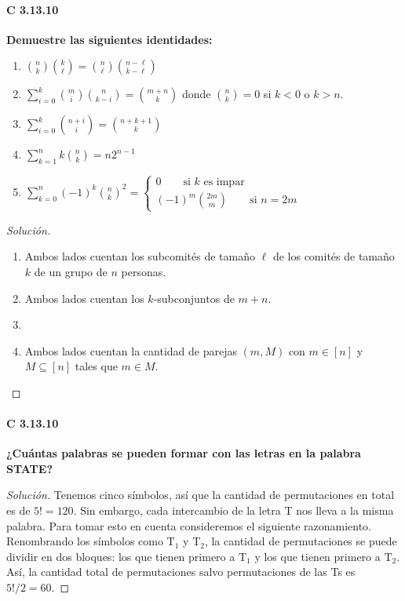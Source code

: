 \documentclass[spanish]{book}
\theoremstyle{definition}
\begin{document}
\paragraph{C 3.13.10} \textbf{Demuestre las siguientes identidades:}
\begin{enumerate}[label=(\alph*)]
	\item ${n\choose k}{k\choose\ell}={n\choose\ell}{n-\ell\choose k-\ell}$
	\item $\sum_{i=0}^k{m\choose i}{n\choose k-i}={m+n\choose k}$ donde ${n\choose k}=0$ si $k<0$ o $k>n$.
	\item $\sum_{i=0}^k{n+i\choose i}={n+k+1\choose k}$
	\item $\sum_{k=1}^nk{n\choose k}=n2^{n-1}$
	\item $\sum_{k=0}^{n}(-1)^k{n\choose k}^2=
	\begin{cases}
		0\qquad\text{si }k\text{ es impar}\\
		(-1)^m{2m\choose m}\qquad\text{si }n=2m
	\end{cases}$
\end{enumerate}
\begin{proof}[Solución]\leavevmode
	\begin{enumerate}[label=(\alph*)]
		\item Ambos lados cuentan los subcomités de tamaño $\ell$ de los comités de tamaño $k$ de un grupo de $n$ personas.
		\item Ambos lados cuentan los $k$-subconjuntos de $m+n$.
		\item 
		\item Ambos lados cuentan la cantidad de parejas $(m,M)$ con $m\in[n]$ y $M\subseteq [n]$ tales que $m\in M$.
	\end{enumerate}
\end{proof}
\paragraph{C 3.13.10} \textbf{¿Cuántas palabras se pueden formar con las letras en la palabra STATE?}
\begin{proof}[Solución]
	Tenemos cinco símbolos, así que la cantidad de permutaciones en total es de $5!=120$.  Sin embargo, cada intercambio de la letra T nos lleva a la misma palabra. Para tomar esto en cuenta consideremos el siguiente razonamiento. Renombrando los símbolos como $\text{T}_1$ y $\text{T}_2$, la cantidad de permutaciones se puede dividir en dos bloques: los que tienen primero a $\text{T}_1$ y los que tienen primero a $\text{T}_2$. Así, la cantidad total de permutaciones salvo permutaciones de las Ts es $5!/2=60$.
\end{proof}
\end{document}
